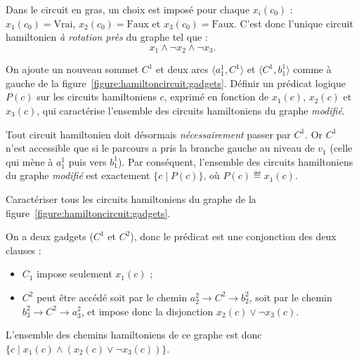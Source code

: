 \begin{exercice}[\textsc{Circuit Hamiltonien} est NP-complet%
    \footnote{Vidéo détaillée de la réduction de \textsc{3-SAT} à \textsc{Cycle Hamiltonien} : \url{https://www.youtube.com/watch?v=OHnX-R_SBpM}}]
  \begin{figure}[h!]%
    \centering
    \reduction%
    \gadget%
  \end{figure}

  \begin{correction}
    Dans le circuit en gras, un choix est imposé pour chaque $x_i(c_0)$ :
    $x_1(c_0)=\text{Vrai}$, $x_2(c_0)=\text{Faux}$ et $x_3(c_0)=\text{Faux}$.
    C'est donc l'unique circuit hamiltonien \emph{à rotation près} du graphe tel que :
    $$ x_1 \land \lnot x_2 \land \lnot x_3.$$
  \end{correction}
  
  \begin{question}
  \item On ajoute un nouveau sommet $C^1$ et deux arcs $\langle a_1^1, C^1\rangle$ et $\langle C^1, b_1^1\rangle$
    comme à gauche de la figure~\ref{figure:hamiltoncircuit:gadgets}.
    Définir un prédicat logique $P(c)$ sur les circuits hamiltoniens $c$,
    exprimé en fonction de $x_1(c)$, $x_2(c)$ et $x_3(c)$,
    qui caractérise l'ensemble des circuits hamiltoniens du graphe \emph{modifié}. 
  \end{question}
  \begin{correction}
    Tout circuit hamiltonien doit désormais \emph{nécessairement} passer par $C^1$.
    Or $C^1$ n'est accessible que si le parcours a pris la branche gauche au niveau de $v_1$ (celle qui mène à $a_1^1$ puis vers $b_1^1$).  
    Par conséquent, l’ensemble des circuits hamiltoniens du graphe \emph{modifié} est exactement $\{c \mid P(c) \}$, où $P(c)  \eqdef x_1(c)$. 
  \end{correction}

  \begin{question}
  \item Caractériser tous les circuits hamiltoniens du graphe de la figure~\ref{figure:hamiltoncircuit:gadgets}. 
  \end{question}
  \begin{correction}
    On a deux gadgets ($C^1$ et $C^2$), donc le prédicat est une conjonction des deux clauses : 
    \begin{itemize}
    \item $C_1$ impose seulement $x_1(c)$ ;
    \item $C^2$ peut être accédé soit par le chemin $a_2^2 \to C^2 \to b_2^2$, soit par le chemin $b_3^2 \to C^2 \to a_3^2$,
      et impose donc la disjonction $x_2(c) \lor \lnot x_3(c)$. 
    \end{itemize}
    L'ensemble des chemins hamiltoniens de ce graphe est donc $\{ c \mid x_1(c) \land (x_2(c) \lor \lnot x_3(c))\}$.
  \end{correction}


\end{exercice}
